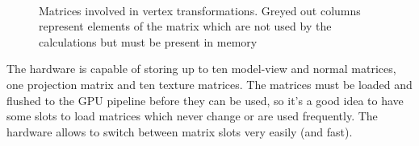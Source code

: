 \documentclass[12pt]{article}
\begin{document}
\begin{figure}[ht]
\centering
{}
\hspace{1em}
\hspace{1em}
\\
\caption{Matrices involved in vertex transformations. Greyed out columns represent elements of the matrix which are not used by the calculations but must be present in memory }
\label{fig:matrices}
\end{figure}

The hardware is capable of storing up to ten model-view and normal matrices, one projection matrix and ten texture matrices. The matrices must be loaded and flushed to the GPU pipeline before they can be used, so it's a good idea to have some slots to load matrices which never change or are used frequently. The hardware allows to switch between matrix slots very easily (and fast).
\end{document}
